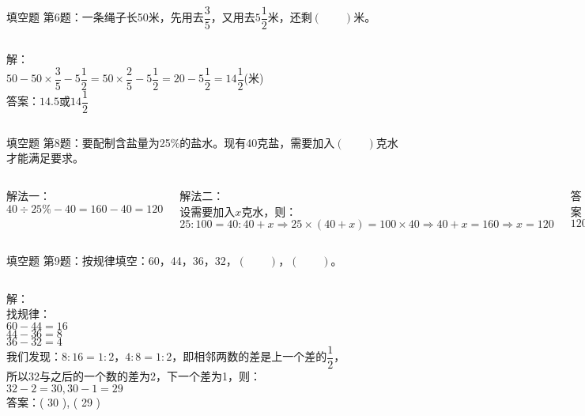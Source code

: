 \documentclass[aspectratio=169]{ctexbeamer} %
\date{\today}
\begin{document}
\begin{frame}[t]{填空题}
第6题：一条绳子长50米，先用去$\dfrac{3}{5}$，又用去$5\dfrac{1}{2}$米，还剩$(\qquad)$米。
\pause
\vspace{1em}
\begin{columns}
解：\\
$50 - 50 \times \dfrac{3}{5} - 5\dfrac{1}{2} = 50 \times \dfrac{2}{5} -  5\dfrac{1}{2} = 20 - 5\dfrac{1}{2} = 14\dfrac{1}{2}$(米) \\
\vspace{1em}
答案：\alert{$14.5$}或\alert{$14\dfrac{1}{2}$}
\end{columns}
\end{frame}

\begin{frame}[t]{填空题}
第8题：要配制含盐量为25\%的盐水。现有40克盐，需要加入$(\qquad)$克水才能满足要求。
\pause
\vspace{1em}
\begin{columns}
解法一：\\
$40 \div 25\% - 40 = 160 - 40 = 120$ \\
\vspace{1em}

解法二：\\
设需要加入$x$克水，则：\\
$25 : 100 = 40 : 40 + x \Rightarrow 25 \times (40 + x) = 100 \times 40 \Rightarrow 40 + x = 160 \Rightarrow x = 120 $ \\
\vspace{1em}

答案：\alert{$120$}
\end{columns}
\end{frame}

\begin{frame}[t]{填空题}
第9题：按规律填空：60，44，36，32，$(\qquad)$，$(\qquad)$。
\pause
\vspace{1em}
\begin{columns}
解：\\
找规律：\\
$60 - 44 = 16$ \\
$44 - 36 = 8$ \\
$36 - 32 = 4$ \\
我们发现：$8 : 16 = 1 : 2$，$4 : 8 = 1 : 2$，即相邻两数的差是上一个差的$\dfrac{1}{2}$，\\
所以32与之后的一个数的差为2，下一个差为1，则：\\
$32 - 2 = 30, 30 - 1 = 29 $ \\
\vspace{1em}
答案：\alert{( 30 ), ( 29 )}
\end{columns}
\end{frame}
\end{document}
